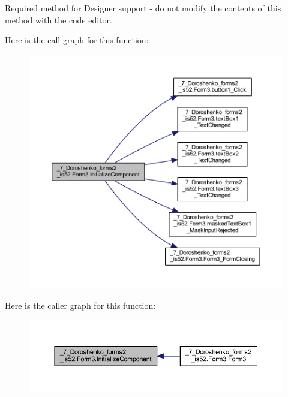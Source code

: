 Required method for Designer support -\/ do not modify the contents of this method with the code editor. 

Here is the call graph for this function\+:
\nopagebreak
\begin{figure}[H]
\begin{center}
\leavevmode
\includegraphics[width=350pt]{class__7___doroshenko__forms2__is52_1_1_form3_ab0dbbaf316cc4293987708f101ead42d_cgraph}
\end{center}
\end{figure}
Here is the caller graph for this function\+:
\nopagebreak
\begin{figure}[H]
\begin{center}
\leavevmode
\includegraphics[width=350pt]{class__7___doroshenko__forms2__is52_1_1_form3_ab0dbbaf316cc4293987708f101ead42d_icgraph}
\end{center}
\end{figure}
\hypertarget{class__7___doroshenko__forms2__is52_1_1_form3_ac3f56359793ceb0d1149f7264dd29004}{}\label{class__7___doroshenko__forms2__is52_1_1_form3_ac3f56359793ceb0d1149f7264dd29004} 
